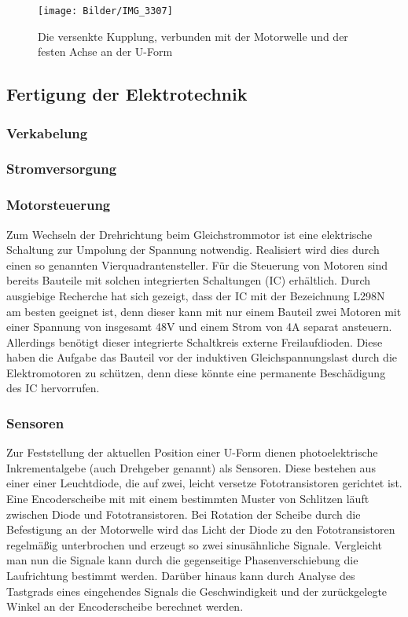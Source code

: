 \documentclass[a4paper, 12pt, bibtotocnumbered, liststotocnumbered]{scrartcl}
\begin{document}
	\begin{figure}[htb]
		\centering
		\texttt{[image: Bilder/IMG\_3307]}
		\caption{Die versenkte Kupplung, verbunden mit der Motorwelle und der festen Achse an der U-Form}
	\end{figure}

	\subsection{Fertigung der Elektrotechnik}
	\subsubsection{Verkabelung}

	\subsubsection{Stromversorgung}

	\subsubsection{Motorsteuerung}
	Zum Wechseln der Drehrichtung beim Gleichstrommotor ist eine elektrische Schaltung zur Umpolung der Spannung notwendig. Realisiert wird dies durch einen so genannten Vierquadrantensteller. Für die Steuerung von Motoren sind bereits Bauteile mit solchen integrierten Schaltungen (IC) erhältlich. Durch ausgiebige Recherche hat sich gezeigt, dass der IC mit der Bezeichnung L298N am besten geeignet ist, denn dieser kann mit nur einem Bauteil zwei Motoren mit einer Spannung von insgesamt 48V und einem Strom von 4A separat ansteuern. Allerdings benötigt dieser integrierte Schaltkreis externe Freilaufdioden. Diese haben die Aufgabe das Bauteil vor der induktiven Gleichspannungslast durch die Elektromotoren zu schützen, denn diese könnte eine permanente Beschädigung des IC hervorrufen.

	\subsubsection{Sensoren}
	Zur Feststellung der aktuellen Position einer U-Form dienen photoelektrische Inkrementalgebe (auch Drehgeber genannt) als Sensoren. Diese bestehen aus einer einer Leuchtdiode, die auf zwei, leicht versetze Fototransistoren gerichtet ist. Eine Encoderscheibe mit mit einem bestimmten Muster von Schlitzen läuft zwischen Diode und Fototransistoren. Bei Rotation der Scheibe durch die Befestigung an der Motorwelle wird das Licht der Diode zu den Fototransistoren regelmäßig unterbrochen und erzeugt so zwei sinusähnliche Signale. Vergleicht man nun die Signale kann durch die gegenseitige Phasenverschiebung die Laufrichtung bestimmt werden. Darüber hinaus kann durch Analyse des Tastgrads eines eingehendes Signals die Geschwindigkeit und der zurückgelegte Winkel an der Encoderscheibe berechnet werden.
\end{document}
